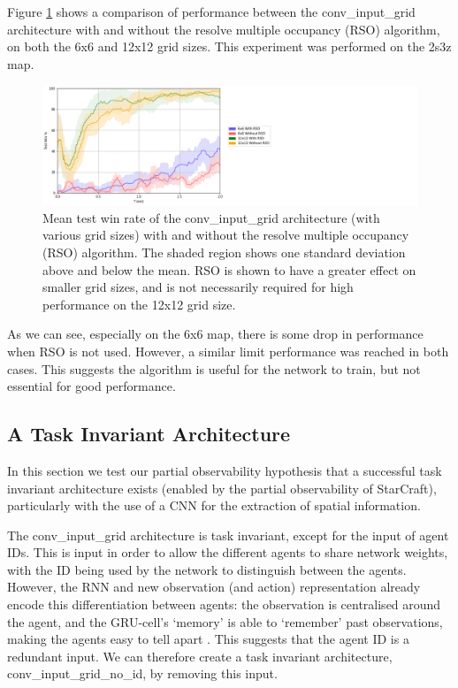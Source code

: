 Figure \ref{fig:multocc} shows a comparison of performance between the conv\_input\_grid architecture with and without the resolve multiple occupancy (RSO) algorithm, on both the 6x6 and 12x12 grid sizes. This experiment was performed on the 2s3z map.

\begin{figure}
    \centering
    \hbox{\hspace{5em}\includegraphics[scale=0.5]{images/graphs/mult_occ.png}}
    \caption{Mean test win rate of the conv\_input\_grid architecture (with various grid sizes) with and without the resolve multiple occupancy (RSO) algorithm. The shaded region shows one standard deviation above and below the mean. RSO is shown to have a greater effect on smaller grid sizes, and is not necessarily required for high performance on the 12x12 grid size.}
    \label{fig:multocc}
\end{figure}

As we can see, especially on the 6x6 map, there is some drop in performance when RSO is not used. However, a similar limit performance was reached in both cases. This suggests the algorithm is useful for the network to train, but not essential for good performance. 


\subsection{A Task Invariant Architecture}
In this section we test our partial observability hypothesis that a successful task invariant architecture exists (enabled by the partial observability of StarCraft), particularly with the use of a CNN for the extraction of spatial information.

The conv\_input\_grid architecture is task invariant, except for the input of agent IDs. This is input in order to allow the different agents to share network weights, with the ID being used by the network to distinguish between the agents. However, the RNN and new observation (and action) representation already encode this differentiation between agents: the observation is centralised around the agent, and the GRU-cell's `memory' is able to `remember' past observations, making the agents easy to tell apart . This suggests that the agent ID is a redundant input. We can therefore create a task invariant architecture, conv\_input\_grid\_no\_id, by removing this input.


